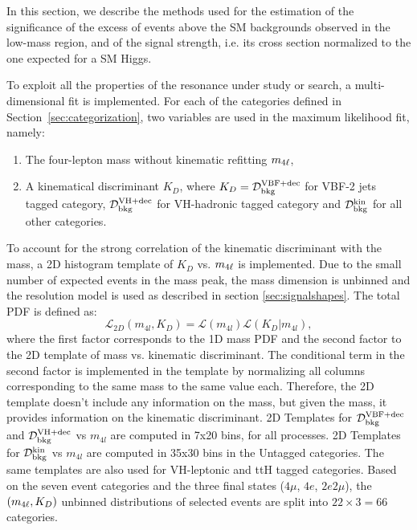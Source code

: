 
In this section, we describe the methods used for the estimation of the significance of the excess of events above the SM backgrounds observed in the low-mass region, and of the signal strength, i.e. its cross section normalized to the one expected for a SM Higgs.

To exploit all the properties of the resonance under study or search, a multi-dimensional fit is implemented.
For each of the categories defined in Section~\ref{sec:categorization}, two variables are used in the maximum likelihood fit, namely:
\begin{enumerate}
\item The four-lepton mass without kinematic refitting $m_{4\ell}$, %
\item A kinematical discriminant $K_D$, where $K_D = {\mathcal{D}}^{\mathrm{VBF}+\mathrm{dec}}_{\mathrm{bkg}}$ for VBF-2 jets tagged category, ${\mathcal{D}}^{\mathrm{VH}+\mathrm{dec}}_{\mathrm{bkg}}$ for VH-hadronic tagged category and ${\cal D}^{\rm kin}_{\rm bkg}$ for all other categories.
\end{enumerate}

To account for the strong correlation of the kinematic discriminant with the mass, a 2D histogram template of $K_D$ vs. $m_{4\ell}$ is implemented.
Due to the small number of expected events in the mass peak, the mass dimension is unbinned and the resolution model is used as described in section \ref{sec:signalshapes}. 
The total PDF is defined as:
\begin{equation}
\mathcal{L}_{2D}(m_{4l},K_D)  =\mathcal{L}(m_{4l}) \mathcal{L}(K_D|m_{4l}) ,
\end{equation}
where the first factor corresponds to the 1D mass PDF and the second factor to the 2D template of mass vs. kinematic discriminant. 
The conditional term in the second factor is implemented in the template by normalizing all columns corresponding to the same mass to the same value each. 
Therefore, the 2D template doesn't include any information on the mass, but given the mass, it provides information on the kinematic discriminant.
2D Templates for ${\mathcal{D}}^{\mathrm{VBF}+\mathrm{dec}}_{\mathrm{bkg}}$ and ${\mathcal{D}}^{\mathrm{VH}+\mathrm{dec}}_{\mathrm{bkg}}$ vs $m_{4l}$ are computed in 7x20 bins, for all processes. 
2D Templates for ${\cal D}^{\rm kin}_{\rm bkg}$ vs $m_{4l}$ are computed in 35x30 bins in the Untagged categories. The same templates are also used for VH-leptonic and ttH tagged categories.
Based on the seven event categories and the three final states ($4\mu$, $4e$, $2e2\mu$), the $(m_{4\ell}, K_D)$ unbinned distributions of selected events are split into $22\times3=66$ categories.


